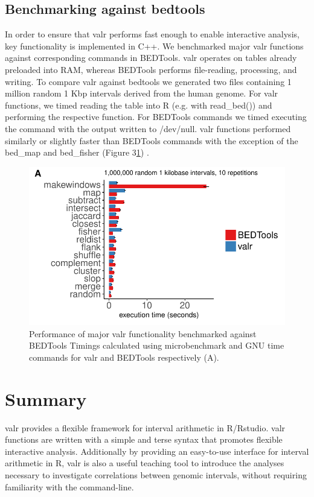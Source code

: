 \documentclass[9pt,a4paper]{extarticle}
\begin{document}
\subsection*{Benchmarking against bedtools}
In order to ensure that valr performs fast enough to enable interactive analysis, key functionality is implemented in C++. We benchmarked major valr functions against corresponding commands in BEDTools. valr operates on tables already preloaded into RAM, whereas BEDTools performs file-reading, processing, and writing. To compare valr against bedtools we generated two files containing 1 million random 1 Kbp intervals derived from the human genome. For valr functions, we timed reading the table into R (e.g. with read\_bed()) and performing the respective function. For BEDTools commands we timed executing the command with the output written to /dev/null. valr functions performed similarly or slightly faster than BEDTools commands with the exception of the bed\_map and bed\_fisher (Figure 3\ref{fig:Figure 3}) . 

\begin{figure}[!htb]
\centering
\includegraphics[width=\textwidth]{benchmarks.pdf}
\caption{\label{fig:Figure 3} Performance of major valr functionality benchmarked against BEDTools \textnormal{Timings calculated using microbenchmark and GNU time commands for valr and BEDTools respectively (A).}}
\end{figure}

\section*{Summary} %
valr provides a flexible framework for interval arithmetic in R/Rstudio. valr functions are written with a simple and terse syntax that promotes flexible interactive analysis. Additionally by providing an easy-to-use interface for interval arithmetic in R, valr is also a useful teaching tool to introduce the analyses necessary to investigate correlations between genomic intervals, without requiring familiarity with the command-line.
\end{document}
